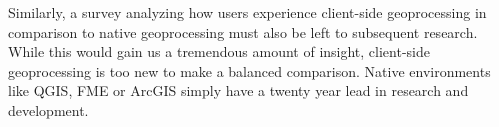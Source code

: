 
Similarly, a survey analyzing how users experience client-side geoprocessing in comparison to native geoprocessing must also be left to subsequent research. While this would gain us a tremendous amount of insight, client-side geoprocessing is too new to make a balanced comparison. Native environments like QGIS, FME or ArcGIS simply have a twenty year lead in research and development. 









